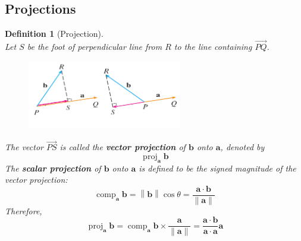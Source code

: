 \documentclass[12pt]{article}
\newcommand\norm[1]{\left\lVert#1\right\rVert}
\newtheorem{definition}{Definition}[section]
\theoremstyle{definition}
\newcommand\ve[1]{\mathbf{#1}}
\DeclareMathOperator{\proj}{proj}
\DeclareMathOperator{\comp}{comp}
\begin{document}
\subsection{Projections}
\begin{definition}[Projection]
\hfill\\\normalfont Let $S$ be the foot of perpendicular line from $R$ to the line containing $\overrightarrow{PQ}$.
\begin{figure}[h]
\centering
\includegraphics[width = 0.6\textwidth]{1_1.png}
\end{figure}
The vector $\overrightarrow{PS}$ is called the \textbf{vector projection} of $\ve{b}$ onto $\ve{a}$, denoted by
\[
\proj_\ve{a}\ve{b}
\]
The \textbf{scalar projection} of $\ve{b}$ onto $\ve{a}$ is defined to be the \textit{signed magnitude} of the vector projection:
\[
\comp_\ve{a}\ve{b} = \norm{\ve{b}}\cos\theta = \frac{\ve{a}\cdot\ve{b}}{\norm{\ve{a}}}
\]
Therefore,
\[
\proj_\ve{a}\ve{b}=\comp_\ve{a}\ve{b}\times\frac{\ve{a}}{\norm{\ve{a}}}=\frac{\ve{a}\cdot\ve{b}}{\ve{a}\cdot\ve{a}}\ve{a}
\]
\end{definition}
\end{document}
